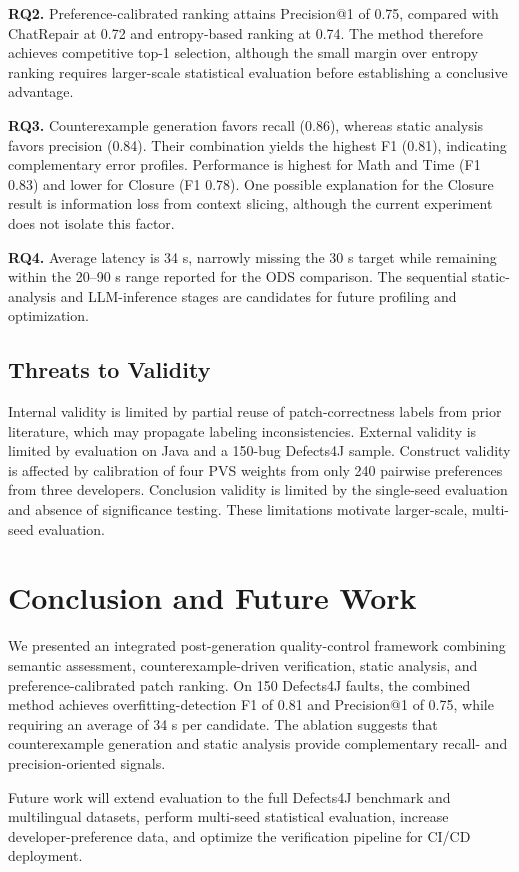 \documentclass[conference]{IEEEtran}
\begin{document}
\textbf{RQ2.} Preference-calibrated ranking attains Precision@1 of 0.75, compared with ChatRepair at 0.72 and entropy-based ranking at 0.74. The method therefore achieves competitive top-1 selection, although the small margin over entropy ranking requires larger-scale statistical evaluation before establishing a conclusive advantage.

\textbf{RQ3.} Counterexample generation favors recall (0.86), whereas static analysis favors precision (0.84). Their combination yields the highest F1 (0.81), indicating complementary error profiles. Performance is highest for Math and Time (F1 0.83) and lower for Closure (F1 0.78). One possible explanation for the Closure result is information loss from context slicing, although the current experiment does not isolate this factor.

\textbf{RQ4.} Average latency is 34 s, narrowly missing the 30 s target while remaining within the 20–90 s range reported for the ODS comparison. The sequential static-analysis and LLM-inference stages are candidates for future profiling and optimization.
\subsection{Threats to Validity}
Internal validity is limited by partial reuse of patch-correctness labels from prior literature, which may propagate labeling inconsistencies. External validity is limited by evaluation on Java and a 150-bug Defects4J sample. Construct validity is affected by calibration of four PVS weights from only 240 pairwise preferences from three developers. Conclusion validity is limited by the single-seed evaluation and absence of significance testing. These limitations motivate larger-scale, multi-seed evaluation.
\section{Conclusion and Future Work}
We presented an integrated post-generation quality-control framework combining semantic assessment, counterexample-driven verification, static analysis, and preference-calibrated patch ranking. On 150 Defects4J faults, the combined method achieves overfitting-detection F1 of 0.81 and Precision@1 of 0.75, while requiring an average of 34 s per candidate. The ablation suggests that counterexample generation and static analysis provide complementary recall- and precision-oriented signals.

Future work will extend evaluation to the full Defects4J benchmark and multilingual datasets, perform multi-seed statistical evaluation, increase developer-preference data, and optimize the verification pipeline for CI/CD deployment.
\end{document}
